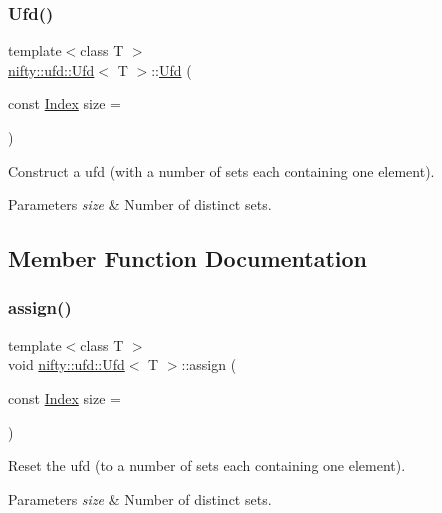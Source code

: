 \subsubsection{\texorpdfstring{Ufd()}{Ufd()}}
{\footnotesize\ttfamily template$<$class T $>$ \\
\hyperlink{classnifty_1_1ufd_1_1Ufd}{nifty\+::ufd\+::\+Ufd}$<$ T $>$\+::\hyperlink{classnifty_1_1ufd_1_1Ufd}{Ufd} (\begin{DoxyParamCaption}\item[{const \hyperlink{classnifty_1_1ufd_1_1Ufd_a0a9a7ab02b6d77fb2035234cbda8b3a7}{Index}}]{size = {} }\end{DoxyParamCaption})\hspace{0.3cm}{\ttfamily [inline]}}

Construct a ufd (with a number of sets each containing one element).


\begin{DoxyParams}{Parameters}
{\em size} & Number of distinct sets. \\
\hline
\end{DoxyParams}


\subsection{Member Function Documentation}
\mbox{\label{classnifty_1_1ufd_1_1Ufd_a9a6de315835c32c6c9ef80603e36cb41}} 
\subsubsection{\texorpdfstring{assign()}{assign()}}
{\footnotesize\ttfamily template$<$class T $>$ \\
void \hyperlink{classnifty_1_1ufd_1_1Ufd}{nifty\+::ufd\+::\+Ufd}$<$ T $>$\+::assign (\begin{DoxyParamCaption}\item[{const \hyperlink{classnifty_1_1ufd_1_1Ufd_a0a9a7ab02b6d77fb2035234cbda8b3a7}{Index}}]{size = {} }\end{DoxyParamCaption})\hspace{0.3cm}{\ttfamily [inline]}}

Reset the ufd (to a number of sets each containing one element).


\begin{DoxyParams}{Parameters}
{\em size} & Number of distinct sets. \\
\hline
\end{DoxyParams}
\mbox{\label{classnifty_1_1ufd_1_1Ufd_ad2010b31862f3d11756e0a5a510499f4}} 
